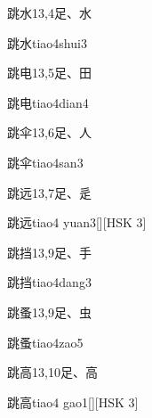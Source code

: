 \begin{entry}{跳水}{13,4}{⾜、⽔}
  \begin{phonetics}{跳水}{tiao4shui3}
  \end{phonetics}
\end{entry}

\begin{entry}{跳电}{13,5}{⾜、⽥}
  \begin{phonetics}{跳电}{tiao4dian4}
  \end{phonetics}
\end{entry}

\begin{entry}{跳伞}{13,6}{⾜、⼈}
  \begin{phonetics}{跳伞}{tiao4san3}
  \end{phonetics}
\end{entry}

\begin{entry}{跳远}{13,7}{⾜、⾡}
  \begin{phonetics}{跳远}{tiao4 yuan3}[][HSK 3]
  \end{phonetics}
\end{entry}

\begin{entry}{跳挡}{13,9}{⾜、⼿}
  \begin{phonetics}{跳挡}{tiao4dang3}
  \end{phonetics}
\end{entry}

\begin{entry}{跳蚤}{13,9}{⾜、⾍}
  \begin{phonetics}{跳蚤}{tiao4zao5}
  \end{phonetics}
\end{entry}

\begin{entry}{跳高}{13,10}{⾜、⾼}
  \begin{phonetics}{跳高}{tiao4 gao1}[][HSK 3]
  \end{phonetics}
\end{entry}

